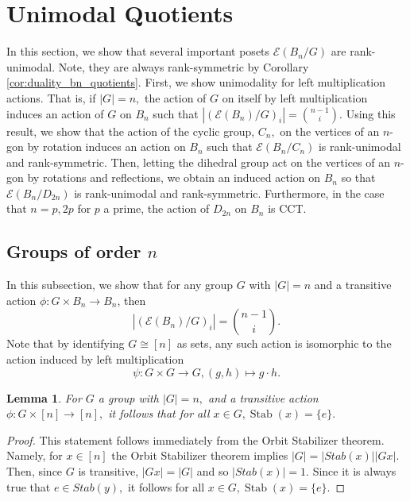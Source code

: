 \documentclass[10 pt]{amsart}
\theoremstyle{plain}
\newtheorem{lem}[thm]{Lemma}
\theoremstyle{definition}
\theoremstyle{remark}
\numberwithin{equation}{section}
\newcommand\ssec{\subsection}
\def\Stab{\operatorname{Stab}}
\begin{document}
\section{Unimodal Quotients}
\label{sec:unimodal}

In this section, we show that several important posets $\mathcal E(B_n/G)$ are rank-unimodal. Note, they are always rank-symmetric by Corollary \ref{cor:duality_bn_quotients}. First, we show unimodality for left multiplication actions. That is, if $|G| = n,$ the action of $G$ on itself by left multiplication induces an action of $G$ on $B_n$ such that $|(\mathcal E(B_n)/G)_i| = \binom {n-1} i.$ Using this result, we show that the action of the cyclic group, $C_n,$ on the vertices of an $n$-gon by rotation induces an action on $B_n$ such that $\mathcal E(B_n/C_n)$ is rank-unimodal and rank-symmetric. Then, letting the dihedral group act on the vertices of an $n$-gon by rotations and reflections, we obtain an induced action on $B_n$ so that $\mathcal E(B_n/D_{2n})$ is rank-unimodal and rank-symmetric. Furthermore, in the case that $n = p,2p$ for $p$ a prime, the action of $D_{2n}$ on $B_n$ is CCT.


\ssec{Groups of order $n$}

In this subsection, we show that for any group $G$ with $|G| = n$ and a transitive action $\phi: G \times B_n \rightarrow B_n$, then $$|(\mathcal E(B_n)/G)_i| = \binom {n-1}{i}.$$ 
Note that by identifying $G \cong [n]$ as sets, any such action is isomorphic to the action induced by left multiplication $$\psi: G\times G \rightarrow G,(g,h)\mapsto g \cdot h.$$ 

\begin{lem}
\label{lem:stabilizer_one}
For $G$ a group with $|G| = n,$ and a transitive action $\phi:G \times [n] \rightarrow [n],$ it follows that for all $x \in G,\Stab(x) = \{e\}.$
\end{lem}
\begin{proof}
This statement follows immediately from the Orbit Stabilizer theorem. Namely, for $x \in [n]$ the Orbit Stabilizer theorem implies $|G| = |Stab(x)||Gx|.$ Then, since $G$ is transitive, $|Gx| = |G|$ and so $|Stab(x)| = 1.$ Since it is always true that $e \in Stab(y),$ it follows for all $x \in G,\Stab(x) = \{e\}.$
\end{proof}
\end{document}
